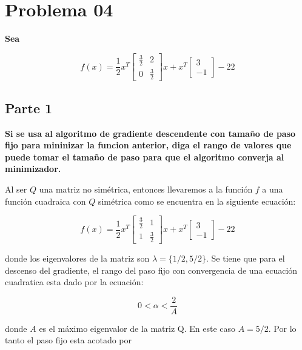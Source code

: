 \section*{Problema 04}

\textbf{Sea}

\begin{equation*}
    f(x) = \frac{1}{2}x^T \begin{bmatrix}
        \frac{3}{2} & 2           \\
        0           & \frac{3}{2}
    \end{bmatrix}x + x^T \begin{bmatrix}
        3 \\ -1
    \end{bmatrix} -22
\end{equation*}

\subsection*{Parte 1}

\textbf{Si se usa al algoritmo de gradiente descendente con tamaño de paso fijo para mininizar la funcion anterior, diga el rango de valores que puede tomar el tamaño de paso para que el algoritmo converja al minimizador.}


Al ser $Q$ una matriz no simétrica, entonces llevaremos a la función $f$ a una función cuadraica con $Q$ simétrica como se encuentra en la siguiente ecuación:

\begin{equation*}
    f(x) = \frac{1}{2}x^T \begin{bmatrix}
        \frac{3}{2} & 1           \\
        1           & \frac{3}{2}
    \end{bmatrix}x + x^T \begin{bmatrix}
        3 \\ -1
    \end{bmatrix} -22
\end{equation*}

donde los eigenvalores de la matriz son $\lambda=\{1/2,5/2\}$. Se tiene que para el descenso del gradiente, el rango del paso fijo con convergencia de una ecuación cuadratica esta dado por la ecuación:

\begin{equation*}
    0 < \alpha < \frac{2}{A}
\end{equation*}

donde $A$ es el máximo eigenvalor de la matriz Q. En este caso $A=5/2$. Por lo tanto el paso fijo esta acotado por

